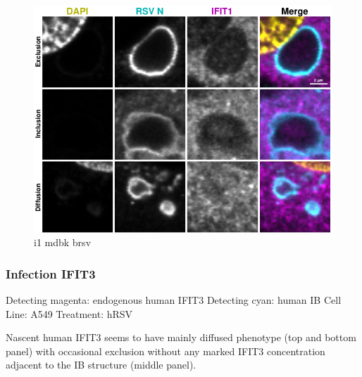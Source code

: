 \begin{figure}
    \centering
    \includegraphics[width=1\linewidth]{09. Chapter 4/Figs/02. Infection/01. IFIT1/09. mdbk i1.pdf}
    \caption[i1 mdbk brsv]{i1 mdbk brsv}
    \label{fig:i1 mdbk brsv}
\end{figure}

\subsubsection{Infection IFIT3}
Detecting magenta: endogenous human IFIT3 \newline
Detecting cyan: human IB \newline
Cell Line: A549 \newline
Treatment: hRSV \newline

Nascent human IFIT3 seems to have mainly diffused phenotype (top and bottom panel) with occasional exclusion without any marked IFIT3 concentration adjacent to the IB structure (middle panel).

